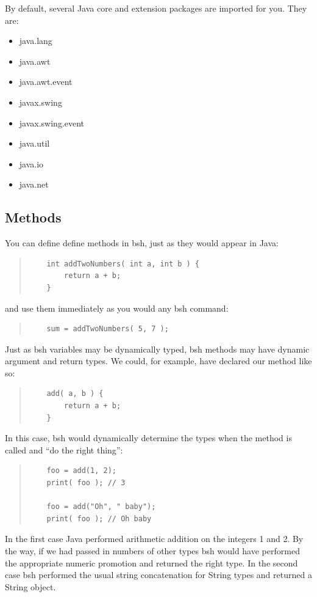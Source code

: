 \documentclass[twoside,11pt]{article}
\renewcommand{\_}{\texttt{\symbol{95}}}
\begin{document}
By default, several Java core and extension packages are imported for
you.  They are:
\begin{itemize}
\item java.lang
\item java.awt
\item java.awt.event
\item javax.swing
\item javax.swing.event
\item java.util
\item java.io
\item java.net
\end{itemize}

\subsection{Methods}

You can define define methods in bsh, just as they would appear in Java:
\begin{quote}
\begin{verbatim}
    int addTwoNumbers( int a, int b ) {
        return a + b;
    }
\end{verbatim}
\end{quote}
and use them immediately as you would any bsh command:
\begin{quote}
\begin{verbatim}
    sum = addTwoNumbers( 5, 7 );
\end{verbatim}
\end{quote}
Just as bsh variables may be dynamically typed, bsh methods may have
dynamic argument and return types.  We could, for example, have declared
our method like so:
\begin{quote}
\begin{verbatim}
    add( a, b ) {
        return a + b;
    }
\end{verbatim}
\end{quote}
In this case, bsh would dynamically determine the types when the method is
called and ``do the right thing'':
\begin{quote}
\begin{verbatim}
    foo = add(1, 2);
    print( foo ); // 3

    foo = add("Oh", " baby");
    print( foo ); // Oh baby
\end{verbatim}
\end{quote}
In the first case Java performed arithmetic addition on the integers 1 and 2.
By the way, if we had passed in numbers of other types bsh would have performed
the appropriate numeric promotion and returned the right type.  In the second
case bsh performed the usual string concatenation for String types and
returned a String object.
\end{document}
